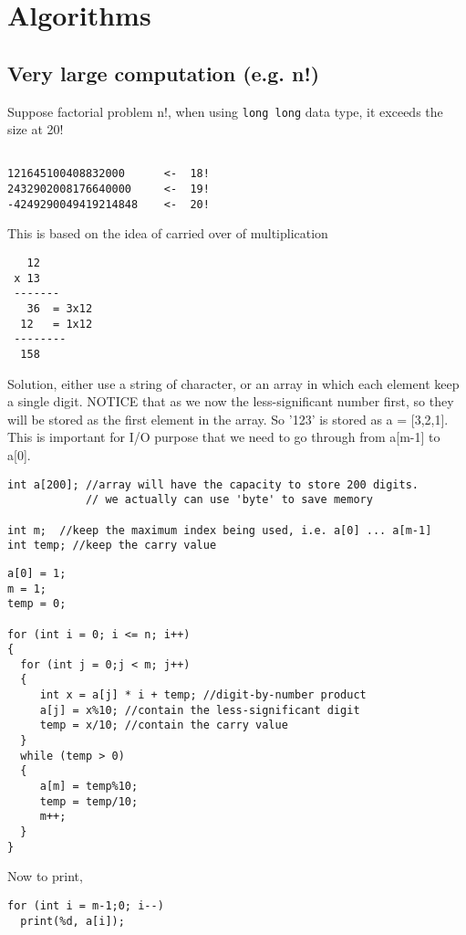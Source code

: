 \chapter{Algorithms}


\section{Very large computation (e.g. n!)}

Suppose factorial problem n!, when using \verb!long long! data type, it exceeds
the size at 20!
\begin{verbatim}

121645100408832000      <-  18!
2432902008176640000     <-  19!
-4249290049419214848    <-  20!
\end{verbatim}


This is based on the idea of carried over of multiplication
\begin{verbatim}
   12
 x 13
 -------
   36  = 3x12
  12   = 1x12
 --------
  158   
\end{verbatim}

Solution, either use a string of character, or an array in which each element
keep a single digit. NOTICE that as we now the less-significant number first, so
they will be stored as the first element in the array. So '123' is stored as 
a = [3,2,1]. This is important for I/O purpose that we need to go through from
a[m-1] to a[0].

\begin{verbatim}
int a[200]; //array will have the capacity to store 200 digits.
            // we actually can use 'byte' to save memory

int m;  //keep the maximum index being used, i.e. a[0] ... a[m-1]
int temp; //keep the carry value
\end{verbatim}

\begin{verbatim}
a[0] = 1;
m = 1;
temp = 0;

for (int i = 0; i <= n; i++)
{
  for (int j = 0;j < m; j++)
  {
     int x = a[j] * i + temp; //digit-by-number product
     a[j] = x%10; //contain the less-significant digit
     temp = x/10; //contain the carry value
  }
  while (temp > 0)
  {
     a[m] = temp%10;
     temp = temp/10;
     m++;
  }
} 
\end{verbatim}

Now to print,
\begin{verbatim}
for (int i = m-1;0; i--)
  print(%d, a[i]);
  
\end{verbatim}
